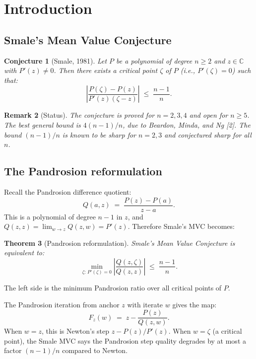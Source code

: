\documentclass[11pt,a4paper]{article}
\newtheorem{theorem}{Theorem}[section]
\newtheorem{conjecture}[theorem]{Conjecture}
\newtheorem{remark}[theorem]{Remark}
\begin{document}
\section{Introduction}

\subsection{Smale's Mean Value Conjecture}

\begin{conjecture}[Smale, 1981]
Let $P$ be a polynomial of degree $n \ge 2$ and $z \in \mathbb{C}$ with $P'(z) \ne 0$. Then there exists a critical point $\zeta$ of $P$ (i.e., $P'(\zeta) = 0$) such that:
\begin{equation}
\left|\frac{P(\zeta) - P(z)}{P'(z)(\zeta - z)}\right| \;\le\; \frac{n - 1}{n}.
\end{equation}
\end{conjecture}

\begin{remark}[Status]
The conjecture is proved for $n = 2, 3, 4$ and open for $n \ge 5$. The best general bound is $4(n - 1)/n$, due to Beardon, Minda, and Ng [2]. The bound $(n - 1)/n$ is known to be sharp for $n = 2, 3$ and conjectured sharp for all $n$.
\end{remark}

\subsection{The Pandrosion reformulation}

Recall the Pandrosion difference quotient:
\begin{equation}
Q(a, z) \;=\; \frac{P(z) - P(a)}{z - a}.
\end{equation}
This is a polynomial of degree $n - 1$ in $z$, and $Q(z, z) = \lim_{w \to z} Q(z, w) = P'(z)$. Therefore Smale's MVC becomes:

\begin{theorem}[Pandrosion reformulation]
Smale's Mean Value Conjecture is equivalent to:
\begin{equation}
\boxed{\min_{\zeta:\, P'(\zeta) = 0} \left|\frac{Q(z, \zeta)}{Q(z, z)}\right| \;\le\; \frac{n - 1}{n}.}
\end{equation}
\end{theorem}

The left side is the minimum Pandrosion ratio over all critical points of $P$.

The Pandrosion iteration from anchor $z$ with iterate $w$ gives the map:
\begin{equation}
F_z(w) \;=\; z - \frac{P(z)}{Q(z, w)}.
\end{equation}
When $w = z$, this is Newton's step $z - P(z)/P'(z)$. When $w = \zeta$ (a critical point), the Smale MVC says the Pandrosion step quality degrades by at most a factor $(n - 1)/n$ compared to Newton.
\end{document}
